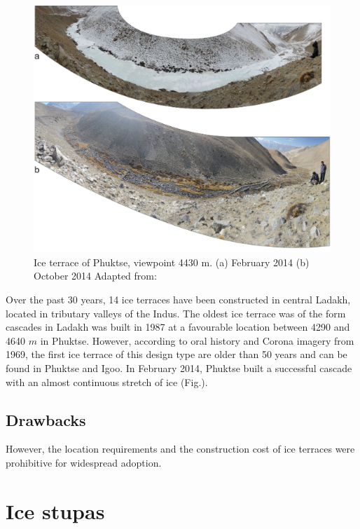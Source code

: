 \begin{figure}[t]
\centering
\includegraphics[width=12cm]{figs/IT_example.png}

\caption{Ice terrace of Phuktse, viewpoint 4430 m. (a) February 2014 (b) October 2014 Adapted from: \cite{nusserSociohydrologyArtificialGlaciers2019}}

\label{fig:ITexample}
\end{figure}

Over the past 30 years, 14 ice terraces have been constructed in central Ladakh, located in tributary valleys of
the Indus. The oldest ice terrace was of the form cascades in Ladakh was built in 1987 at a favourable location
between 4290 and 4640 $m$ in Phuktse. However, according to oral history and Corona imagery from 1969, the first ice
terrace of this design type are older than 50 years and can be found in Phuktse and Igoo. In February 2014,
Phuktse built a successful cascade with an almost continuous stretch of ice (Fig.).


\subsection{Drawbacks}

However, the location requirements and the construction cost of ice terraces were prohibitive for widespread
adoption. 


\section{Ice stupas}

